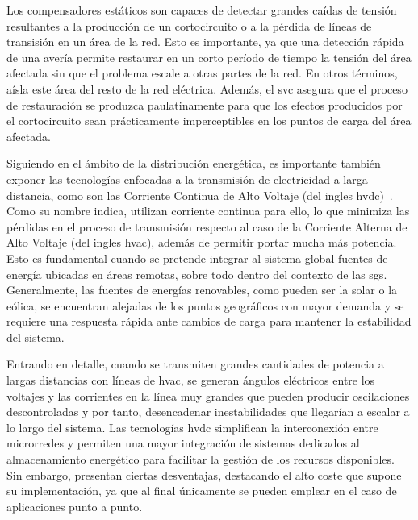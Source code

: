 \pagebreak

\vspace{3mm}

Los compensadores estáticos son capaces de detectar grandes caídas de tensión resultantes a la producción de un cortocircuito o a la pérdida de líneas de transisión en un área de la red. Esto es importante, ya que una detección rápida de una avería permite restaurar en un corto período de tiempo la tensión del área afectada sin que el problema escale a otras partes de la red. En otros términos, aísla este área del resto de la red eléctrica. Además, el \gls{svc} asegura que el proceso de restauración se produzca paulatinamente para que los efectos producidos por el cortocircuito sean prácticamente imperceptibles en los puntos de carga del área afectada. 

\vspace{3mm}

Siguiendo en el ámbito de la distribución energética, es importante también exponer las tecnologías enfocadas a la transmisión de electricidad a larga distancia, como son las Corriente Continua de Alto Voltaje (del ingles \gls{hvdc})~\cite{hvdc}. Como su nombre indica, utilizan corriente continua para ello, lo que minimiza las pérdidas en el proceso de transmisión respecto al caso de la Corriente Alterna de Alto Voltaje (del ingles \gls{hvac}), además de permitir portar mucha más potencia. Esto es fundamental cuando se pretende integrar al sistema global fuentes de energía ubicadas en áreas remotas, sobre todo dentro del contexto de las \gls{sg}s. Generalmente, las fuentes de energías renovables, como pueden ser la solar o la eólica, se encuentran alejadas de los puntos geográficos con mayor demanda y se requiere una respuesta rápida ante cambios de carga para mantener la estabilidad del sistema. 

\vspace{3mm}

Entrando en detalle, cuando se transmiten grandes cantidades de potencia a largas distancias con líneas de \gls{hvac}, se generan ángulos eléctricos entre los voltajes y las corrientes en la línea muy grandes que pueden producir oscilaciones descontroladas y por tanto, desencadenar inestabilidades que llegarían a escalar a lo largo del sistema. Las tecnologías \gls{hvdc} simplifican la interconexión entre microrredes y permiten una mayor integración de sistemas dedicados al almacenamiento energético para facilitar la gestión de los recursos disponibles. Sin embargo, presentan ciertas desventajas, destacando el alto coste que supone su implementación, ya que al final únicamente se pueden emplear en el caso de aplicaciones punto a punto.

